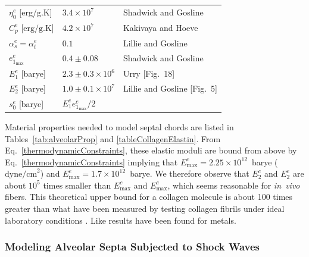 \begin{table}
\begin{tabular}{lll}
        $\eta_0^e$ \hfill [erg/g.K] & $3.4 \times 10^7$ & 
        Shadwick and Gosline \cite{ShadwickGosline85} \\
        $C^e_p$ \hfill [$\textrm{erg/g.K}$] & $4.2 \times 10^7$  & 
        Kakivaya and Hoeve \cite{KakivayaHoeve75} \\
        $\alpha^e_s = \alpha^e_t$ & $0.1$ & 
        Lillie and Gosline \cite{LillieGosline02a} \\ 
        $e^e_{1_{\max}}$ & $0.4 \pm 0.08$ & Shadwick and Gosline \cite{ShadwickGosline85} \\
        $E^e_1$ \hfill [barye] & $2.3 \pm 0.3 \times 10^6$ & Urry \cite{Urry89} [Fig.~18]\\ 
        $E^e_2$ \hfill [barye] & $1.0 \pm 0.1 \times 10^7$ & 
        Lillie and Gosline \cite{LillieGosline07} [Fig.~5]\\
        $s^e_0$ \hfill [barye] & $E^e_1 e^e_{1_{\max}} / 2$ & \\
        \hline
    \end{tabular}
\end{table}

Material properties needed to model septal chords are listed in Tables~\ref{tab:alveolarProp} and \ref{tableCollagenElastin}.  From Eq.~\ref{thermodynamicConstraints}, these elastic moduli are bound from above by Eq.~\ref{thermodynamicConstraints} implying that $E^c_{\max} = 2.25 \times 10^{12}$~barye ($\text{dyne/cm}^2$) and $E^e_{\max} = 1.7 \times 10^{12}$~barye.  We therefore observe that $E^c_2$ and $E^e_2$ are about $10^5$ times smaller than $E^c_{\max}$ and $E^e_{\max}$, which seems reasonable for \textit{in~vivo\/} fibers.  This theoretical upper bound for a collagen molecule is about 100 times greater than what have been measured by testing collagen fibrils under ideal laboratory conditions \cite{Svenssonetal10}.  Like results have been found for metals.

\subsubsection{Modeling Alveolar Septa Subjected to Shock Waves}
\label{secConjugatePairs}

